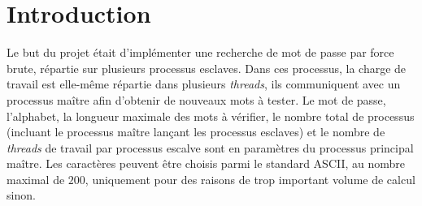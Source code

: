 \section*{Introduction} %
\label{sec:introduction}
Le but du projet était d'implémenter une recherche de mot de passe par force brute, répartie sur plusieurs processus esclaves. Dans ces processus, la charge de travail est elle-même répartie dans plusieurs \emph{threads}, ils communiquent avec un processus maître afin d'obtenir de nouveaux mots à tester. Le mot de passe, l'alphabet, la longueur maximale des mots à vérifier, le nombre total de processus (incluant le processus maître lançant les processus esclaves) et le nombre de \emph{threads} de travail par processus escalve sont en paramètres du processus principal maître. Les caractères peuvent être choisis parmi le standard \textsf{ASCII}, au nombre maximal de $200$, uniquement pour des raisons de trop important volume de calcul sinon.

